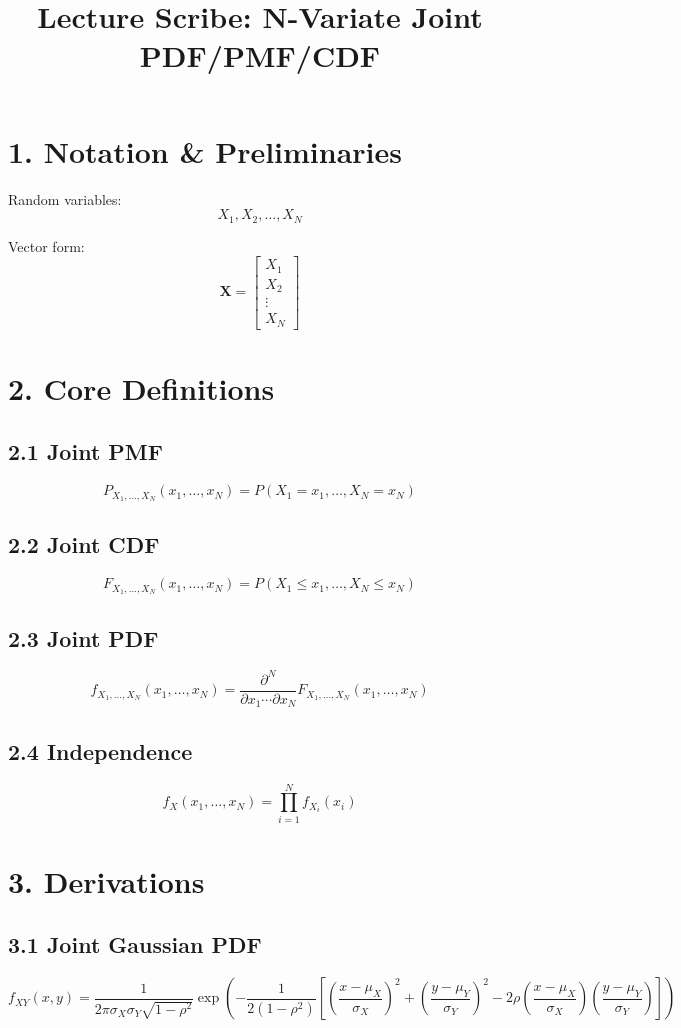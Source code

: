 \documentclass[12pt]{article}
\title{Lecture Scribe: N-Variate Joint PDF/PMF/CDF}
\author{}
\date{}
\begin{document}
\maketitle

\section*{1. Notation \& Preliminaries}

Random variables:
\[
X_1, X_2, \dots, X_N
\]

Vector form:
\[
\mathbf{X} =
\begin{bmatrix}
X_1 \\ X_2 \\ \vdots \\ X_N
\end{bmatrix}
\]

\section*{2. Core Definitions}

\subsection*{2.1 Joint PMF}
\[
P_{X_1,\dots,X_N}(x_1,\dots,x_N)
= P(X_1 = x_1, \dots, X_N = x_N)
\]

\subsection*{2.2 Joint CDF}
\[
F_{X_1,\dots,X_N}(x_1,\dots,x_N)
= P(X_1 \le x_1, \dots, X_N \le x_N)
\]

\subsection*{2.3 Joint PDF}
\[
f_{X_1,\dots,X_N}(x_1,\dots,x_N)
=
\frac{\partial^N}{\partial x_1 \cdots \partial x_N}
F_{X_1,\dots,X_N}(x_1,\dots,x_N)
\]

\subsection*{2.4 Independence}
\[
f_X(x_1,\dots,x_N) = \prod_{i=1}^{N} f_{X_i}(x_i)
\]

\section*{3. Derivations}

\subsection*{3.1 Joint Gaussian PDF}
\[
f_{XY}(x,y)
=
\frac{1}{2\pi \sigma_X \sigma_Y \sqrt{1-\rho^2}}
\exp\left(
-\frac{1}{2(1-\rho^2)}
\left[
\left(\frac{x-\mu_X}{\sigma_X}\right)^2
+
\left(\frac{y-\mu_Y}{\sigma_Y}\right)^2
-
2\rho \left(\frac{x-\mu_X}{\sigma_X}\right)\left(\frac{y-\mu_Y}{\sigma_Y}\right)
\right]
\right)
\]
\end{document}
